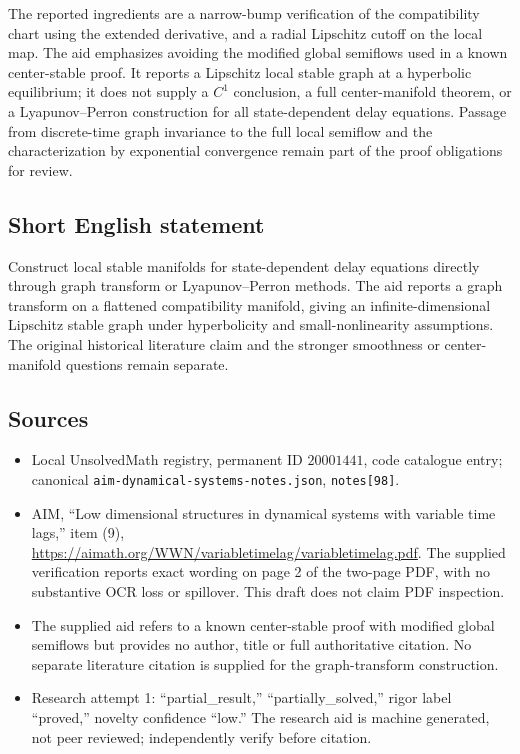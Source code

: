 \documentclass[11pt]{article}
\begin{document}
The reported ingredients are a narrow-bump verification of the compatibility chart using the extended derivative, and a radial Lipschitz cutoff on the local map. The aid emphasizes avoiding the modified global semiflows used in a known center-stable proof. It reports a Lipschitz local stable graph at a hyperbolic equilibrium; it does not supply a \(C^1\) conclusion, a full center-manifold theorem, or a Lyapunov--Perron construction for all state-dependent delay equations. Passage from discrete-time graph invariance to the full local semiflow and the characterization by exponential convergence remain part of the proof obligations for review.
\subsection{Short English statement}
Construct local stable manifolds for state-dependent delay equations directly through graph transform or Lyapunov--Perron methods. The aid reports a graph transform on a flattened compatibility manifold, giving an infinite-dimensional Lipschitz stable graph under hyperbolicity and small-nonlinearity assumptions. The original historical literature claim and the stronger smoothness or center-manifold questions remain separate.
\subsection{Sources}
\begin{itemize}
\item Local UnsolvedMath registry, permanent ID \(20001441\), code catalogue entry; canonical \texttt{aim-dynamical-systems-notes.json}, \texttt{notes[98]}.
\item AIM, ``Low dimensional structures in dynamical systems with variable time lags,'' item (9), \url{https://aimath.org/WWN/variabletimelag/variabletimelag.pdf}. The supplied verification reports exact wording on page 2 of the two-page PDF, with no substantive OCR loss or spillover. This draft does not claim PDF inspection.
\item The supplied aid refers to a known center-stable proof with modified global semiflows but provides no author, title or full authoritative citation. No separate literature citation is supplied for the graph-transform construction.
\item Research attempt 1: ``partial\_result,'' ``partially\_solved,'' rigor label ``proved,'' novelty confidence ``low.'' The research aid is machine generated, not peer reviewed; independently verify before citation.
\end{itemize}
\end{document}
